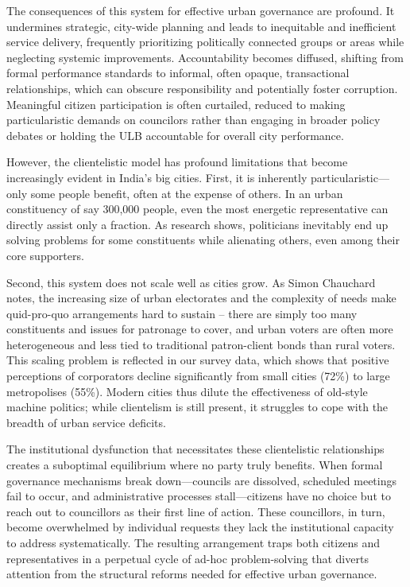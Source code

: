 The consequences of this system for effective urban governance are profound. It undermines strategic, city-wide planning and leads to inequitable and inefficient service delivery, frequently prioritizing politically connected groups or areas while neglecting systemic improvements. Accountability becomes diffused, shifting from formal performance standards to informal, often opaque, transactional relationships, which can obscure responsibility and potentially foster corruption. Meaningful citizen participation is often curtailed, reduced to making particularistic demands on councilors rather than engaging in broader policy debates or holding the ULB accountable for overall city performance.

However, the clientelistic model has profound limitations that become increasingly evident in India's big cities. First, it is inherently particularistic—only some people benefit, often at the expense of others. In an urban constituency of say 300,000 people, even the most energetic representative can directly assist only a fraction. As research shows, politicians inevitably end up solving problems for some constituents while alienating others, even among their core supporters.

Second, this system does not scale well as cities grow. As Simon Chauchard notes, the increasing size of urban electorates and the complexity of needs make quid-pro-quo arrangements hard to sustain – there are simply too many constituents and issues for patronage to cover, and urban voters are often more heterogeneous and less tied to traditional patron-client bonds than rural voters. This scaling problem is reflected in our survey data, which shows that positive perceptions of corporators decline significantly from small cities (72\%) to large metropolises (55\%). Modern cities thus dilute the effectiveness of old-style machine politics; while clientelism is still present, it struggles to cope with the breadth of urban service deficits.

The institutional dysfunction that necessitates these clientelistic relationships creates a suboptimal equilibrium where no party truly benefits. When formal governance mechanisms break down—councils are dissolved, scheduled meetings fail to occur, and administrative processes stall—citizens have no choice but to reach out to councillors as their first line of action. These councillors, in turn, become overwhelmed by individual requests they lack the institutional capacity to address systematically. The resulting arrangement traps both citizens and representatives in a perpetual cycle of ad-hoc problem-solving that diverts attention from the structural reforms needed for effective urban governance.

